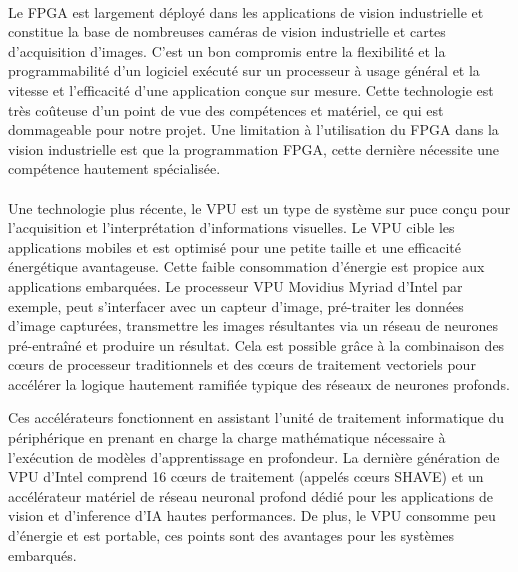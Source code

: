 \paragraph{}
\label{sec:FPGA_hwInf}

Le \gls{FPGA} est largement déployé dans les applications de vision industrielle et constitue la base de nombreuses caméras de vision industrielle et cartes d'acquisition d'images. 
C'est un bon compromis entre la flexibilité et la programmabilité d'un logiciel exécuté sur un processeur à usage général et la vitesse et l'efficacité d'une application conçue sur mesure. 
Cette technologie est très coûteuse d'un point de vue des compétences et matériel, ce qui est dommageable pour notre projet.
Une limitation à l'utilisation du \gls{FPGA} dans la vision industrielle est que la programmation \gls{FPGA}, cette dernière nécessite une compétence hautement spécialisée.

\paragraph{}
\label{sec:VPU_hwInf}

Une technologie plus récente, le \gls{VPU} est un type de système sur puce conçu pour l'acquisition et l'interprétation d'informations visuelles. 
Le \gls{VPU} cible les applications mobiles et est optimisé pour une petite taille et une efficacité énergétique avantageuse. 
Cette faible consommation d'énergie est propice aux applications embarquées. 
Le processeur \gls{VPU} Movidius Myriad d'Intel \cite{Movidius} par exemple, peut s'interfacer avec un capteur d'image, 
pré-traiter les données d'image capturées, transmettre les images résultantes via un réseau de neurones pré-entraîné et produire un résultat. 
Cela est possible grâce à la combinaison des cœurs de processeur traditionnels et des cœurs de traitement vectoriels pour accélérer la logique hautement ramifiée typique des réseaux de neurones profonds.

Ces accélérateurs fonctionnent en assistant l'unité de traitement informatique du périphérique en prenant en charge la charge mathématique nécessaire à l'exécution de modèles d'apprentissage en profondeur. 
La dernière génération de \gls{VPU} d'Intel comprend 16 cœurs de traitement (appelés cœurs SHAVE) et un accélérateur matériel de réseau neuronal profond dédié pour les applications de vision et d'\gls{inference} d'\gls{IA} hautes performances.
De plus, le \gls{VPU} consomme peu d'énergie et est portable, ces points sont des avantages pour les systèmes embarqués.


